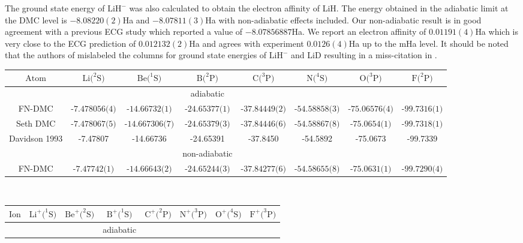 \documentclass[aps,prl,superscriptaddress,groupedaddress]{revtex4}
\begin{document}
The ground state energy of $\text{LiH}^-$ was also calculated to obtain the electron affinity of LiH. The energy obtained in the adiabatic limit at the DMC level is $-8.08220(2)$Ha and $-8.07811(3)$Ha with non-adiabatic effects included. Our non-adiabatic result is in good agreement with a previous ECG study \cite{Bubin_LiH_noBO} which reported a value of $-8.07856887$Ha. We report an electron affinity of $0.01191(4)$Ha which is very close to the ECG prediction of $0.012132(2)$Ha and agrees with experiment $0.0126(4)$Ha up to the mHa level. It should be noted that the authors of \cite{Bubin_LiH_noBO} mislabeled the columns for ground state energies of $\text{LiH}^-$ and LiD resulting in a miss-citation in \cite{Mitroy_ECG}.

\begin{table*}[htpb!]
\setlength{\extrarowheight}{3pt}
\begin{tabular}{*{1}{*{8}{c}}}
\hline\hline
$\text{Atom}$ & $\text{Li}(^2\text{S)}$ & $\text{Be}(^1\text{S)}$ & $\text{B}(^2\text{P)}$ & $\text{C}(^3\text{P)}$ & $\text{N}(^4\text{S)}$ & $\text{O}(^3\text{P)}$ & $\text{F}(^2\text{P)}$ \\ \hline
&&&adiabatic&&&& \\
FN-DMC & $\text{-7.478056(4)}$ & $\text{-14.66732(1)}$ & $\text{-24.65377(1)}$ & $\text{-37.84449(2)}$ & $\text{-54.58858(3)}$ & $\text{-75.06576(4)}$ & $\text{-99.7316(1)}$ \\
Seth DMC \cite{Seth_Bench} & $\text{-7.478067(5)}$ & $\text{-14.667306(7)}$ & $\text{-24.65379(3)}$ & $\text{-37.84446(6)}$ & $\text{-54.58867(8)}$ & $\text{-75.0654(1)}$ & $\text{-99.7318(1)}$ \\
Davidson 1993 \cite{Davidson_Atoms} &  -7.47807 & -14.66736 & -24.65391 & -37.8450 &-54.5892 & -75.0673 & -99.7339 \\
&&&non-adiabatic&&&& \\
FN-DMC & $\text{-7.47742(1)}$ & $\text{-14.66643(2)}$ & $\text{-24.65244(3)}$ & $\text{-37.84277(6)}$ & $\text{-54.58655(8)}$ & $\text{-75.0631(1)}$ & $\text{-99.7290(4)}$ \\
\hline
\end{tabular} \\ 
\begin{tabular}{*{1}{*{8}{c}}}
$\text{Ion}$ & $\text{Li}^+(^1\text{S)}$ & $\text{Be}^+(^2\text{S)}$ & $\text{B}^+(^1\text{S)}$ & $\text{C}^+(^2\text{P)}$ & $\text{N}^+(^3\text{P)}$ & $\text{O}^+(^4\text{S)}$ & $\text{F}^+(^3\text{P)}$ \\ \hline
&&&adiabatic&&&& \\

\end{tabular}
\end{table*}
\end{document}
